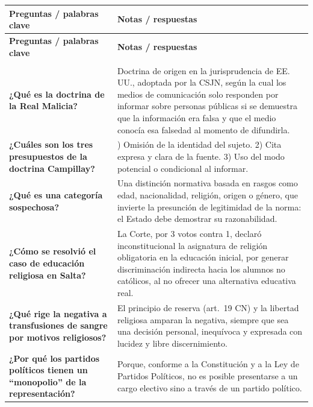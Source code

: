 \documentclass[12pt,oneside]{book}
\begin{document}
\begin{longtable}{
    >{\raggedright\arraybackslash}p{4.4cm}
    >{\raggedright\arraybackslash}p{9.6cm}
}
\toprule
\textbf{Preguntas / palabras clave} &
\textbf{Notas / respuestas} \\
\midrule
\endfirsthead
\toprule
\textbf{Preguntas / palabras clave} &
\textbf{Notas / respuestas} \\
\midrule
\endhead
\midrule
\multicolumn{2}{r}{\textit{Continúa en la página siguiente}} \\
\endfoot
\endlastfoot

\textbf{¿Qué es la doctrina de la Real Malicia?} &
Doctrina de origen en la jurisprudencia de EE.\,UU., adoptada por la CSJN, según la cual los medios de comunicación solo responden por informar sobre personas públicas si se demuestra que la información era falsa y que el medio conocía esa falsedad al momento de difundirla. \\

\addlinespace
\textbf{¿Cuáles son los tres presupuestos de la doctrina Campillay?} &
1) Omisión de la identidad del sujeto. 2) Cita expresa y clara de la fuente. 3) Uso del modo potencial o condicional al informar. \\

\addlinespace
\textbf{¿Qué es una categoría sospechosa?} &
Una distinción normativa basada en rasgos como edad, nacionalidad, religión, origen o género, que invierte la presunción de legitimidad de la norma: el Estado debe demostrar su razonabilidad. \\

\addlinespace
\textbf{¿Cómo se resolvió el caso de educación religiosa en Salta?} &
La Corte, por 3 votos contra 1, declaró inconstitucional la asignatura de religión obligatoria en la educación inicial, por generar discriminación indirecta hacia los alumnos no católicos, al no ofrecer una alternativa educativa real. \\

\addlinespace
\textbf{¿Qué rige la negativa a transfusiones de sangre por motivos religiosos?} &
El principio de reserva (art.\ 19 CN) y la libertad religiosa amparan la negativa, siempre que sea una decisión personal, inequívoca y expresada con lucidez y libre discernimiento. \\

\addlinespace
\textbf{¿Por qué los partidos políticos tienen un ``monopolio'' de la representación?} &
Porque, conforme a la Constitución y a la Ley de Partidos Políticos, no es posible presentarse a un cargo electivo sino a través de un partido político. \\


\end{longtable}
\end{document}
